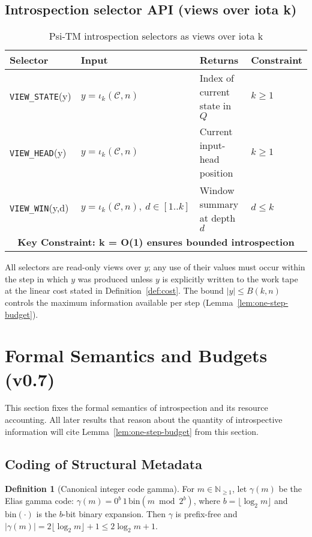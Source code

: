 \documentclass[11pt]{article}
\theoremstyle{plain}
\theoremstyle{definition}
\newtheorem{definition}[theorem]{Definition}
\begin{document}
\subsection{Introspection selector API (views over iota k)}

\begin{table}[ht]
\centering
\caption{Psi-TM introspection selectors as views over iota k}
\label{tab:introspection-api}
\begin{tabular}{|l|l|l|l|}
\hline
\textbf{Selector} & \textbf{Input} & \textbf{Returns} & \textbf{Constraint} \\
\hline
\texttt{VIEW\_STATE}(y) & $y=\iota_k(\mathcal{C},n)$ & Index of current state in $Q$ & $k \ge 1$ \\
\hline
\texttt{VIEW\_HEAD}(y) & $y=\iota_k(\mathcal{C},n)$ & Current input-head position & $k \ge 1$ \\
\hline
\texttt{VIEW\_WIN}(y,d) & $y=\iota_k(\mathcal{C},n),\ d\in[1..k]$ & Window summary at depth $d$ & $d \le k$ \\
\hline
\multicolumn{4}{|c|}{\textbf{Key Constraint: k = O(1) ensures bounded introspection}} \\
\hline
\end{tabular}
\end{table}

All selectors are read-only views over $y$; any use of their values must occur within the step in which $y$ was produced unless $y$ is explicitly written to the work tape at the linear cost stated in Definition~\ref{def:cost}. The bound $|y|\le B(k,n)$ controls the maximum information available per step (Lemma~\ref{lem:one-step-budget}).

\section{Formal Semantics and Budgets (v0.7)}

This section fixes the formal semantics of introspection and its resource accounting. All later results that reason about the quantity of introspective information will cite Lemma~\ref{lem:one-step-budget} from this section.

\subsection{Coding of Structural Metadata}

\begin{definition}[Canonical integer code gamma]
\label{def:gamma}
For $m\in\mathbb{N}_{\ge1}$, let $\gamma(m)$ be the Elias gamma code: $\gamma(m)=0^{b}\,1\,\mathrm{bin}(m\bmod 2^{b})$, where $b=\lfloor\log_2 m\rfloor$ and $\mathrm{bin}(\cdot)$ is the $b$-bit binary expansion. Then $\gamma$ is prefix-free and $|\gamma(m)|=2\lfloor\log_2 m\rfloor+1\le 2\log_2 m + 1$.
\end{definition}
\end{document}

